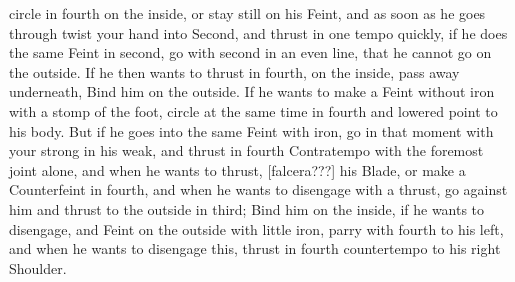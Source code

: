 \newpage


\newpage


circle in fourth on the inside, or stay still on his Feint, and as
soon as he goes through twist your hand into Second, and thrust in one
tempo quickly, if he does the same Feint in second, go with second in
an even line, that he cannot go on the outside. If he then wants to
thrust in fourth, on the inside, pass away underneath, Bind him on the
outside. If he wants to make a Feint without iron with a stomp of the
foot, circle at the same time in fourth and lowered point to his
body. But if he goes into the same Feint with iron, go in that moment
with your strong in his weak, and thrust in fourth Contratempo with
the foremost joint alone, and when he wants to thrust,
[falcera???]
his Blade, or make a Counterfeint in fourth, and when he wants to
disengage with a thrust, go against him and thrust to the outside in
third; Bind him on the inside, if he wants to disengage, and Feint on
the outside with little iron, parry with fourth to his left, and when
he wants to disengage this, thrust in fourth countertempo to his right
Shoulder.


